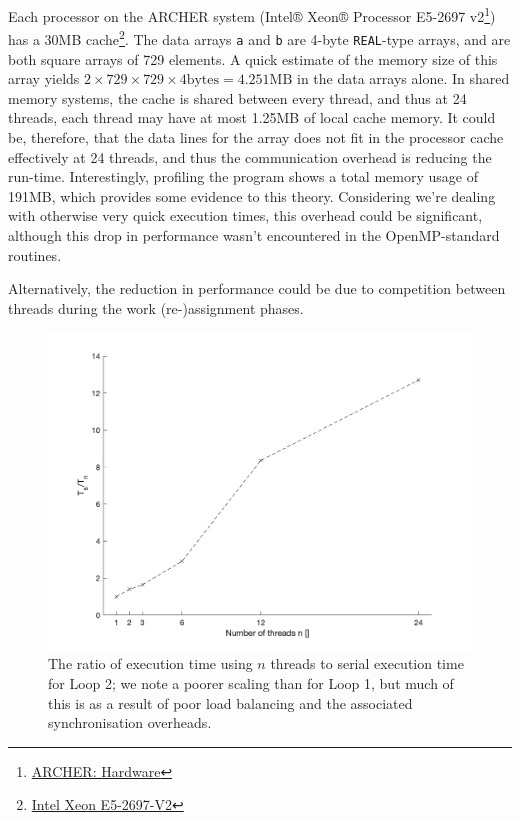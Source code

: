 \documentclass{article} %
\newcommand{\tp}{\texttt}
\begin{document}
Each processor on the ARCHER system (Intel® Xeon® Processor E5-2697 v2\footnote{\href{http://archer.ac.uk/about-archer/hardware/}{ARCHER: Hardware}}) has a 30MB cache\footnote{\href{https://ark.intel.com/content/www/us/en/ark/products/75283/intel-xeon-processor-e5-2697-v2-30m-cache-2-70-ghz.html}{Intel Xeon E5-2697-V2}}.
The data arrays \tp{a} and \tp{b} are 4-byte \tp{REAL}-type arrays, and are both square arrays of 729 elements.
A quick estimate of the memory size of this array yields $2 \times 729 \times 729 \times 4 \text{bytes} = 4.251\text{MB}$ in the data arrays alone.
In shared memory systems, the cache is shared between every thread, and thus at 24 threads, each thread may have at most 1.25MB of local cache memory.
It could be, therefore, that the data lines for the array does not fit in the processor cache effectively at 24 threads, and thus the communication overhead is reducing the run-time.
Interestingly, profiling the program shows a total memory usage of 191MB, which provides some evidence to this theory.
Considering we're dealing with otherwise very quick execution times, this overhead could be significant, although this drop in performance wasn't encountered in the OpenMP-standard routines.

Alternatively, the reduction in performance could be due to competition between threads during the work (re-)assignment phases.

\begin{figure}
    \centering
    \includegraphics[height=.35\textheight]{part2_plots/speedup_affinity_loop2.png}
    \caption{The ratio of execution time using $n$ threads to serial execution time for Loop 2; we note a poorer scaling than for Loop 1, but much of this is as a result of poor load balancing and the associated synchronisation overheads.}
\end{figure}
\end{document}
